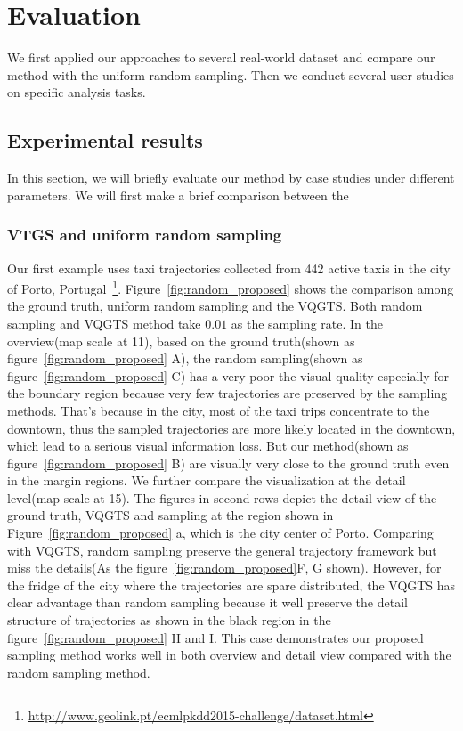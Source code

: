 \section{Evaluation}
We first applied our approaches to several real-world dataset and compare our method with the uniform random sampling. Then we conduct several user studies on specific analysis tasks. 
\subsection{Experimental results}
In this section, we will briefly evaluate our method by case studies under different parameters. We will first make a brief comparison between the 
\subsubsection{VTGS and uniform random sampling}
Our first example uses taxi trajectories collected from 442 active taxis in the city of Porto, Portugal~\footnote{\url{http://www.geolink.pt/ecmlpkdd2015-challenge/dataset.html}}. Figure~\ref{fig:random_proposed} shows the comparison among the ground truth, uniform random sampling and the VQGTS. Both random sampling and VQGTS method take $0.01$ as the sampling rate. 
In the overview(map scale at 11), based on the ground truth(shown as figure~\ref{fig:random_proposed} A), the random sampling(shown as figure~\ref{fig:random_proposed} C) has a very poor the visual quality especially for the boundary region because very few trajectories are preserved by the sampling methods. That's because in the city, most of the taxi trips concentrate to the downtown, thus the sampled trajectories are more likely located in the downtown, which lead to a serious visual information loss.  
But our method(shown as figure~\ref{fig:random_proposed} B) are visually very close to the ground truth even in the margin regions. 
We further compare the visualization at the detail level(map scale at 15).
The figures in second rows depict the detail view of the ground truth, VQGTS and sampling at the region shown in Figure~\ref{fig:random_proposed} a, which is the city center of Porto. Comparing with VQGTS, random sampling preserve the general trajectory framework but miss the details(As the figure~\ref{fig:random_proposed}F, G shown). However, for the fridge of the city where the trajectories are spare distributed, the VQGTS has clear advantage than random sampling because it well preserve the detail structure of trajectories as shown in the black region in the figure~\ref{fig:random_proposed} H and I. This case demonstrates our proposed sampling method works well in both overview and detail view compared with the random sampling method.

